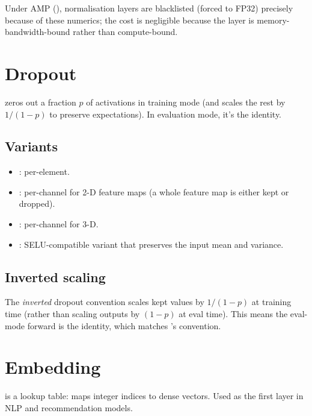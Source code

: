 Under AMP (), normalisation layers are blacklisted
(forced to FP32) precisely because of these numerics; the
cost is negligible because the layer is memory-bandwidth-bound
rather than compute-bound.

\section{Dropout}
\label{sec:linear_conv_norm:dropout}

 zeros out a fraction $p$ of activations in
training mode (and scales the rest by $1/(1-p)$ to preserve
expectations). In evaluation mode, it's the identity.

\subsection{Variants}
\label{ssec:linear_conv_norm:dropout_variants}

\begin{itemize}
  \item {}: per-element.
  \item {}: per-channel for 2-D feature maps (a
    whole feature map is either kept or dropped).
  \item {}: per-channel for 3-D.
  \item {}: SELU-compatible variant that
    preserves the input mean and variance.
\end{itemize}

\subsection{Inverted scaling}
\label{ssec:linear_conv_norm:inverted_scaling}

The \emph{inverted} dropout convention scales kept values by
$1/(1-p)$ at training time (rather than scaling outputs by
$(1-p)$ at eval time). This means the eval-mode forward is the
identity, which matches 's convention.

\section{Embedding}
\label{sec:linear_conv_norm:embedding}

 is a lookup
table: maps integer indices to dense vectors. Used as the first
layer in NLP and recommendation models.

